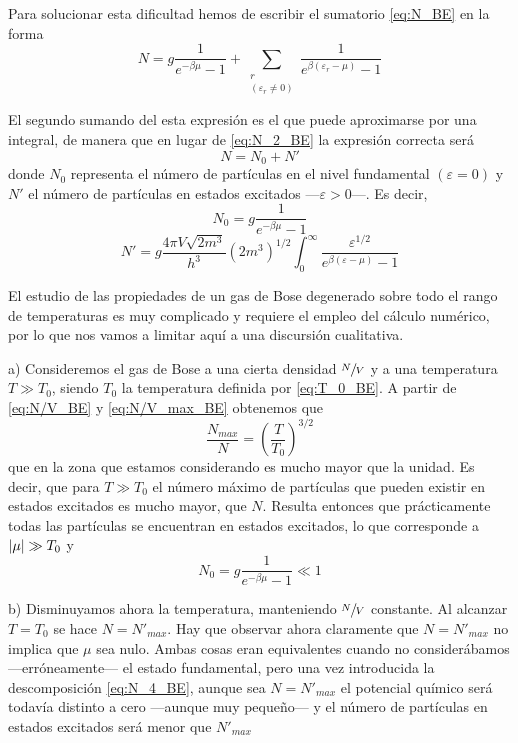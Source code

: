 Para solucionar esta dificultad hemos de escribir el sumatorio \eqref{eq:N_BE} en la forma
\begin{equation}\label{eq:N_3_BE}
	N = g \frac{1}{e^{-\beta\mu} - 1} + \sum_{\substack{r\\(\varepsilon_r \neq 0)}} \frac{1}{e^{\beta(\varepsilon_r -\mu)} - 1}
\end{equation}

El segundo sumando del esta expresión es el que puede aproximarse por una integral, de manera que en lugar de \eqref{eq:N_2_BE} la expresión correcta será
\begin{equation}\label{eq:N_4_BE}
	N = N_0 + N' 
\end{equation}
donde $N_0$ representa el número de partículas en el nivel fundamental $(\varepsilon = 0)$ y $N'$ el número de partículas en estados excitados ---$\varepsilon > 0$---. Es decir,
\begin{equation}
	N_0 = g \frac{1}{e^{-\beta\mu} - 1}
\end{equation}
\begin{equation}
	N' = g \frac{4\pi V\sqrt{2m^3}}{h^3} (2m^3)^{1/2} \int_{0}^{\infty} \frac{\varepsilon^{1/2}}{e^{\beta(\varepsilon -\mu)} - 1}
\end{equation}

El estudio de las propiedades de un gas de Bose degenerado sobre todo el rango de temperaturas es muy complicado y requiere el empleo del cálculo numérico, por lo que nos vamos a limitar aquí a una discursión cualitativa.

a) Consideremos el gas de Bose a una cierta densidad $\sfrac{N}{V}$ y a una temperatura $T \gg T_0$, siendo $T_0$ la temperatura definida por \eqref{eq:T_0_BE}.
A partir de \eqref{eq:N/V_BE} y \eqref{eq:N/V_max_BE} obtenemos que
\begin{equation}\label{eq:N/N_max}
	\frac{N_{max}}{N} = \left( \frac{T}{T_0} \right)^{3/2}
\end{equation}
que en la zona que estamos considerando es mucho mayor que la unidad.
Es decir, que para $T \gg T_0$ el número máximo de partículas que pueden existir en estados excitados es mucho mayor, que $N$.
Resulta entonces que prácticamente todas las partículas se encuentran en estados excitados, lo que corresponde a $\abs{\mu} \gg T_0$ y
\begin{equation}
	N_0 = g \frac{1}{e^{-\beta\mu} - 1} \ll 1
\end{equation}

b) Disminuyamos ahora la temperatura, manteniendo $\sfrac{N}{V}$ constante.
Al alcanzar $T = T_0$ se hace $N = N'_{max}$.
Hay que observar ahora claramente que $N = N'_{max}$ no implica que $\mu$ sea nulo.
Ambas cosas eran equivalentes cuando no considerábamos ---erróneamente--- el estado fundamental, pero una vez introducida la descomposición \eqref{eq:N_4_BE}, aunque sea $N = N'_{max}$ el potencial químico será todavía distinto a cero ---aunque muy pequeño--- y el número de partículas en estados excitados será menor que $N'_{max}$

